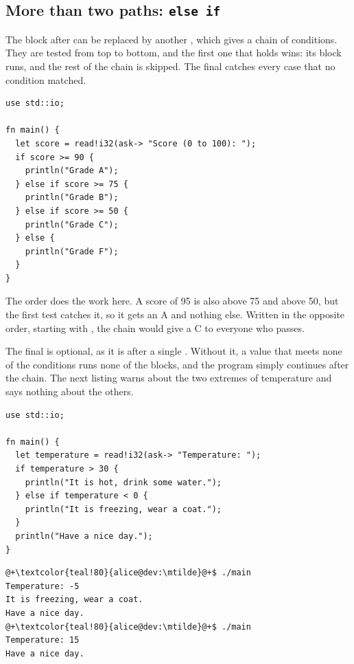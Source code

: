 

\subsection{More than two paths: \texttt{else if}}

The block after  can be replaced by another , which gives a
chain of conditions. They are tested from top to bottom, and the first one that
holds wins: its block runs, and the rest of the chain is skipped. The final
 catches every case that no condition matched.

\begin{lstlisting}[style=coloredverbatim, caption=A chain of conditions, label=lst:control:else_if]
use std::io;

fn main() {
  let score = read!i32(ask-> "Score (0 to 100): ");
  if score >= 90 {
    println("Grade A");
  } else if score >= 75 {
    println("Grade B");
  } else if score >= 50 {
    println("Grade C");
  } else {
    println("Grade F");
  }
}
\end{lstlisting}

The order does the work here. A score of 95 is also above 75 and above 50, but
the first test catches it, so it gets an A and nothing else. Written in the
opposite order, starting with , the chain would give a C to
everyone who passes.

The final  is optional, as it is after a single . Without
it, a value that meets none of the conditions runs none of the blocks, and the
program simply continues after the chain. The next listing warns about the two
extremes of temperature and says nothing about the others.

\begin{lstlisting}[style=coloredverbatim, caption=A chain with no final \token{else}, label=lst:control:else_if_no_else]
use std::io;

fn main() {
  let temperature = read!i32(ask-> "Temperature: ");
  if temperature > 30 {
    println("It is hot, drink some water.");
  } else if temperature < 0 {
    println("It is freezing, wear a coat.");
  }
  println("Have a nice day.");
}
\end{lstlisting}
\vspace{-10pt}%
\begin{lstlisting}[style=bashVerb, escapechar=@+]
@+\textcolor{teal!80}{alice@dev:\mtilde}@+$ ./main
Temperature: -5
It is freezing, wear a coat.
Have a nice day.
@+\textcolor{teal!80}{alice@dev:\mtilde}@+$ ./main
Temperature: 15
Have a nice day.
\end{lstlisting}

